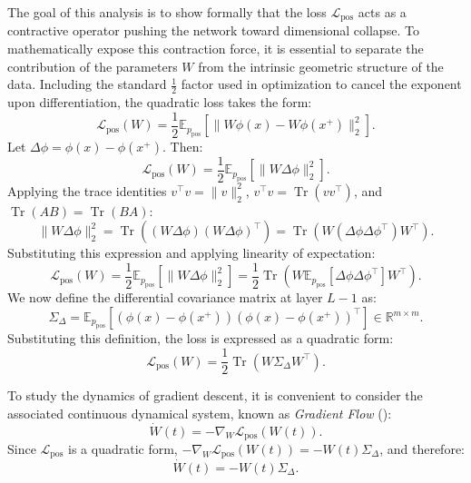 \documentclass[11pt, oneside, openany]{book}
\DeclareMathOperator{\Tr}{Tr}
\begin{document}
The goal of this analysis is to show formally that the loss $\mathcal{L}_{\text{pos}}$ acts as a contractive operator pushing the network toward dimensional collapse. To mathematically expose this contraction force, it is essential to separate the contribution of the parameters $W$ from the intrinsic geometric structure of the data. Including the standard $\frac{1}{2}$ factor used in optimization to cancel the exponent upon differentiation, the quadratic loss takes the form:
\begin{equation}
\label{eq:3.16}
\mathcal{L}_{\text{pos}}(W) = \frac{1}{2} \mathbb{E}_{p_{\text{pos}}} \left[ \lVert W \phi(x) - W \phi(x^{+}) \rVert_{2}^{2} \right].
\end{equation}
Let $\Delta \phi = \phi(x) - \phi(x^{+})$. Then:
\begin{equation}
\label{eq:3.17}
\mathcal{L}_{\text{pos}}(W) = \frac{1}{2} \mathbb{E}_{p_{\text{pos}}} \left[ \lVert W \Delta \phi \rVert_{2}^{2} \right].
\end{equation}
Applying the trace identities $v^{\top} v = \lVert v \rVert_{2}^{2}$, $v^{\top} v = \Tr(v v^{\top})$, and $\Tr(AB) = \Tr(BA)$:
\begin{equation}
\label{eq:3.18}
\lVert W \Delta \phi \rVert_{2}^{2} = \Tr\left( (W \Delta \phi)(W \Delta \phi)^{\top} \right) = \Tr\left( W (\Delta \phi \Delta \phi^{\top}) W^{\top} \right).
\end{equation}
Substituting this expression and applying linearity of expectation:
\begin{equation}
\label{eq:3.19}
\mathcal{L}_{\text{pos}}(W) = \frac{1}{2} \mathbb{E}_{p_{\text{pos}}} \left[ \lVert W \Delta \phi \rVert_{2}^{2} \right] = \frac{1}{2} \Tr\left( W \mathbb{E}_{p_{\text{pos}}}[\Delta \phi \Delta \phi^{\top}] W^{\top} \right).
\end{equation}
We now define the differential covariance matrix at layer $L-1$ as:
\begin{equation}
\label{eq:3.20}
\Sigma_{\Delta} = \mathbb{E}_{p_{\text{pos}}} \left[ (\phi(x) - \phi(x^{+}))(\phi(x) - \phi(x^{+}))^{\top} \right] \in \mathbb{R}^{m \times m}.
\end{equation}
Substituting this definition, the loss is expressed as a quadratic form:
\begin{equation}
\label{eq:3.21}
\mathcal{L}_{\text{pos}}(W) = \frac{1}{2} \Tr\left( W \Sigma_{\Delta} W^{\top} \right).
\end{equation}

To study the dynamics of gradient descent, it is convenient to consider the associated continuous dynamical system, known as \textit{Gradient Flow} ():
\begin{equation}
\label{eq:3.22}
\dot{W}(t) = -\nabla_{W} \mathcal{L}_{\text{pos}}(W(t)).
\end{equation}
Since $\mathcal{L}_{\text{pos}}$ is a quadratic form, $-\nabla_{W} \mathcal{L}_{\text{pos}}(W(t)) = -W(t) \Sigma_{\Delta}$, and therefore:
\begin{equation}
\label{eq:3.23}
\dot{W}(t) = -W(t) \Sigma_{\Delta}.
\end{equation}
\end{document}
